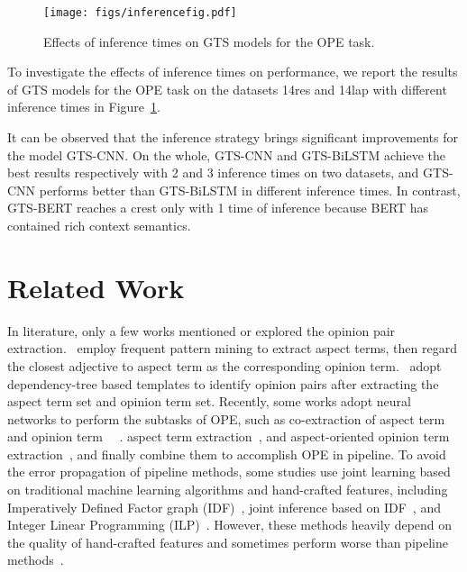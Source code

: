 \documentclass[11pt,a4paper]{article}
\begin{document}
\begin{figure}[h]
	\centering
	\texttt{[image: figs/inferencefig.pdf]}
	\caption{Effects of inference times on GTS models for the OPE task.}
	\label{inference times}
\end{figure} 

To investigate the effects of inference times on performance, we report the results of GTS models for the OPE task on the datasets 14res and 14lap with different inference times in Figure~\ref{inference times}.

It can be observed that the inference strategy brings significant improvements for the model GTS-CNN. On the whole, GTS-CNN and GTS-BiLSTM achieve the best results respectively with 2 and 3 inference times on two datasets, and GTS-CNN performs better than GTS-BiLSTM in different inference times. In contrast, GTS-BERT reaches a crest only with 1 time of inference because BERT has contained rich context semantics.




\section{Related Work}
\label{relatedwork}
In literature, only a few works mentioned or explored the opinion pair extraction.~ employ frequent pattern mining to extract aspect terms, then regard the closest adjective to aspect term as the corresponding opinion term.~ adopt dependency-tree based templates to identify opinion pairs after extracting the aspect term set and opinion term set. Recently, some works adopt neural networks to perform the subtasks of OPE, such as co-extraction of aspect term and opinion term ~\cite{DBLP:conf/aaai/WangPDX17,DBLP:conf/acl/DaiS19}~\cite{DBLP:conf/acl/XuLSY18}. aspect term extraction~\cite{DBLP:conf/acl/XuLSY18}, and aspect-oriented opinion term extraction~\cite{DBLP:conf/naacl/FanWDHC19,DBLP:conf/aaai/WuZDHC20}, and finally combine them to accomplish OPE in pipeline. To avoid the error propagation of pipeline methods, some studies use joint learning based on traditional machine learning algorithms and hand-crafted features, including Imperatively Defined Factor graph (IDF)~\cite{klinger-cimiano-2013-bi}, joint inference based on IDF~\cite{DBLP:conf/icdm/KlingerC13}, and Integer Linear Programming (ILP)~\cite{DBLP:conf/acl/YangC13}. However, these methods heavily depend on the quality of hand-crafted features and sometimes perform worse than pipeline methods~\cite{DBLP:conf/icdm/KlingerC13}. 
\end{document}
